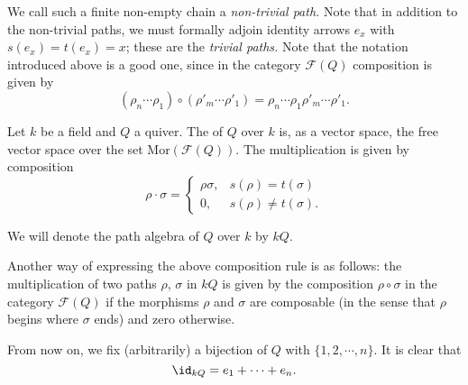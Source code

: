 \documentclass[main.tex]{subfiles}
\begin{document}
We call such a finite non-empty chain a \emph{non-trivial path.} Note that in addition to the non-trivial paths, we must formally adjoin identity arrows $e_{x}$ with $s(e_{x}) = t(e_{x}) = x$; these are the \emph{trivial paths.} Note that the notation introduced above is a good one, since in the category $\mathcal{F}(Q)$ composition is given by
\begin{equation*}
  (\rho_{n}\cdots \rho_{1}) \circ (\rho'_{m}\cdots \rho'_{1}) = \rho_{n}\cdots \rho_{1} \rho'_{m}\cdots \rho'_{1}.
\end{equation*}

\begin{definition}
  \label{def:path_algebra}
  Let $k$ be a field and $Q$ a quiver. The  of $Q$ over $k$ is, as a vector space, the free vector space over the set $\mathrm{Mor}(\mathcal{F}(Q))$. The multiplication is given by composition 
  \begin{equation*}
    \rho\cdot \sigma =
    \begin{cases}
      \rho\sigma, & s(\rho) = t(\sigma) \\
      0, & s(\rho) \neq t(\sigma).
    \end{cases}
  \end{equation*}

  We will denote the path algebra of $Q$ over $k$ by $kQ$.

\end{definition}

Another way of expressing the above composition rule is as follows: the multiplication of two paths $\rho$, $\sigma$ in $kQ$ is given by the composition $\rho \circ \sigma$ in the category $\mathcal{F}(Q)$ if the morphisms $\rho$ and $\sigma$ are composable (in the sense that $\rho$ begins where $\sigma$ ends) and zero otherwise.

From now on, we fix (arbitrarily) a bijection of $Q$ with $\{1,2,\cdots,n\}$. It is clear that
\begin{equation*}
  \id_{kQ} = e_{1} + \cdots + e_{n}.
\end{equation*}
\end{document}
